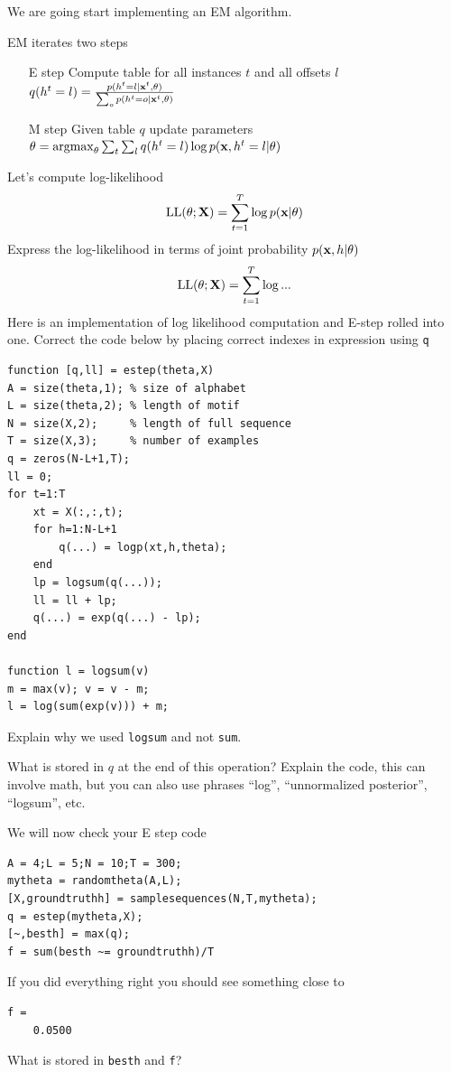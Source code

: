\documentclass{article}
\begin{document}
{\newproblem{2pt} We are going start implementing an EM algorithm.

EM iterates two steps
\begin{itemize}
\item[E step] Compute table for all instances $t$ and all offsets $l$ $q(h^t = l) = \frac{p(h^t = l|\mathbf{x}^t,\theta)}{\sum_o p(h^t = o|\mathbf{x}^t,\theta)}$
\item[M step] Given table $q$ update parameters $\theta = \mathop{\rm argmax}_\theta \sum_t \sum_l q(h^t = l) \log p(\mathbf{x},h^t = l|\theta)$
\end{itemize}


Let's compute log-likelihood 
\[
\textrm{LL}(\theta;\mathbf{X}) = \sum_{t=1}^T\log p(\mathbf{x}|\theta)
\]
Express the log-likelihood in terms of joint probability $p(\mathbf{x},h|\theta)$ 
\[
\textrm{LL}(\theta;\mathbf{X}) = \sum_{t=1}^T\log ...
\]
Here is an implementation of log likelihood computation and E-step rolled into one.
Correct the code below by placing correct indexes in expression using \verb|q|
\begin{verbatim}
function [q,ll] = estep(theta,X)
A = size(theta,1); % size of alphabet
L = size(theta,2); % length of motif
N = size(X,2);     % length of full sequence
T = size(X,3);     % number of examples
q = zeros(N-L+1,T);
ll = 0;
for t=1:T
    xt = X(:,:,t); 
    for h=1:N-L+1
        q(...) = logp(xt,h,theta);
    end
    lp = logsum(q(...));
    ll = ll + lp;
    q(...) = exp(q(...) - lp);
end  

function l = logsum(v)
m = max(v); v = v - m;
l = log(sum(exp(v))) + m;
\end{verbatim}
Explain why we used \verb|logsum| and not \verb|sum|. \answer

What is stored in $q$ at the end of this operation? Explain the code, this can involve math, but you can also use
phrases ``log'', ``unnormalized posterior'', ``logsum'', etc.
\answer
 

We will now check your E step code

\begin{verbatim}
A = 4;L = 5;N = 10;T = 300;
mytheta = randomtheta(A,L);
[X,groundtruthh] = samplesequences(N,T,mytheta);
q = estep(mytheta,X);
[~,besth] = max(q);
f = sum(besth ~= groundtruthh)/T
\end{verbatim}

If you did everything right you should see something close to 
\begin{verbatim}
f =
    0.0500
\end{verbatim}

What is stored in \verb|besth| and \verb|f|? \answer

}
\end{document}
